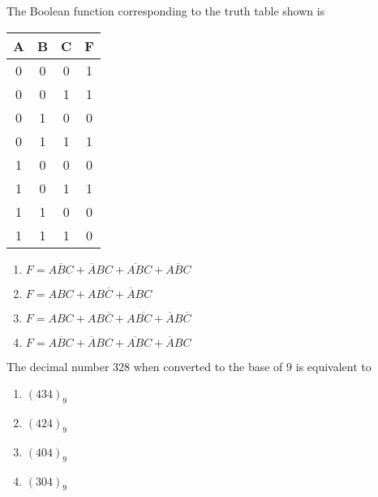     \item The Boolean function corresponding to the truth table shown is
        \begin{table}[!ht]
        \centering
        \begin{tabular}{c|c|c|c}
    A & B & C & F \\
    \hline
    0 & 0 & 0 & 1 \\
    \hline
    0 & 0 & 1 & 1 \\
    \hline
    0 & 1 & 0 & 0 \\
    \hline
    0 & 1 & 1 & 1 \\
    \hline
    1 & 0 & 0 & 0 \\
    \hline
    1 & 0 & 1 & 1 \\
    \hline
    1 & 1 & 0 & 0 \\
    \hline
    1 & 1 & 1 & 0 \\
    \hline
\end{tabular}
        \end{table}
        \begin{enumerate}
            \item $F=A\overline{B}C+\overline{A}BC+\overline{AB}C+\overline{ABC}$
            \item $F=ABC+AB\overline{C}+\overline{A}BC$
            \item $F=ABC+AB\overline{C}+A\overline{BC}+\overline{A}B\overline{C}$
            \item $F=A\overline{B}C+\overline{A}BC+\overline{AB}C+\overline{A}BC$
        \end{enumerate}

    \item The decimal number $328$ when converted to the base of $9$ is equivalent to 
        \begin{enumerate}
            \item $(434)_9$
            \item $(424)_9$
            \item $(404)_9$
            \item $(304)_9$
        \end{enumerate}

